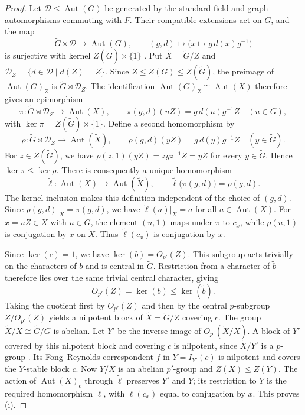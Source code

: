\documentclass[11pt,a4paper]{article}
\theoremstyle{definition}
\theoremstyle{remark}
\numberwithin{equation}{section}
\DeclareMathOperator{\Aut}{Aut}
\begin{document}
\begin{proof}
		Let $\mathcal D\leq\Aut(G)$ be generated by the standard field
		and graph automorphisms commuting with $F$. Their compatible
		extensions act on $\widetilde G$, and the map
		\[
		\widetilde G\rtimes\mathcal D\longrightarrow\Aut(G),\qquad
		(g,d)\longmapsto\bigl(x\mapsto g\,d(x)g^{-1}\bigr)
		\]
		is surjective with kernel $Z(\widetilde G)\times\{1\}$
		\cite[pp.~873--874]{MalleSpath2016}. Put $\widetilde X=\widetilde G/Z$ and
		$\mathcal D_Z=\{d\in\mathcal D\mid d(Z)=Z\}$. Since
		$Z\leq Z(G)\leq Z(\widetilde G)$, the preimage of $\Aut(G)_Z$
		is $\widetilde G\rtimes\mathcal D_Z$. The identification
		$\Aut(G)_Z\cong\Aut(X)$ therefore gives an epimorphism
		\[
		\pi:\widetilde G\rtimes\mathcal D_Z\longrightarrow\Aut(X),
		\qquad \pi(g,d)(uZ)=g\,d(u)g^{-1}Z\quad(u\in G),
		\]
		with $\ker\pi=Z(\widetilde G)\times\{1\}$.
		Define a second homomorphism by
		\[
		\rho:\widetilde G\rtimes\mathcal D_Z\longrightarrow\Aut(\widetilde X),
		\qquad \rho(g,d)(yZ)=g\,d(y)g^{-1}Z\quad(y\in\widetilde G).
		\]
		For $z\in Z(\widetilde G)$, we have
		$\rho(z,1)(yZ)=zyz^{-1}Z=yZ$ for every $y\in\widetilde G$.
		Hence $\ker\pi\leq\ker\rho$. There is consequently a unique
		homomorphism
		\[
		\widetilde\ell:\Aut(X)\longrightarrow\Aut(\widetilde X),
		\qquad \widetilde\ell\bigl(\pi(g,d)\bigr)=\rho(g,d).
		\]
		The kernel inclusion makes this definition independent of the
		choice of $(g,d)$. Since $\rho(g,d)|_X=\pi(g,d)$, we have
		$\widetilde\ell(a)|_X=a$ for all $a\in\Aut(X)$.
		For $x=uZ\in X$ with $u\in G$, the element $(u,1)$ maps under
		$\pi$ to $c_x$, while $\rho(u,1)$ is conjugation by $x$ on
		$\widetilde X$. Thus $\widetilde\ell(c_x)$ is conjugation by $x$.
		
		Since $\ker(c)=1$, we have $\ker(b)=O_{p'}(Z)$. This subgroup
		acts trivially on the characters of $b$ and is central in
		$\widetilde G$. Restriction from a character of $\widetilde b$
		therefore lies over the same trivial central character, giving
		\[
		O_{p'}(Z)=\ker(b)\leq\ker(\widetilde b).
		\]
		Taking the quotient first by $O_{p'}(Z)$ and then by the central
		$p$-subgroup $Z/O_{p'}(Z)$ yields a nilpotent block of
		$\widetilde X=\widetilde G/Z$ covering $c$.
		The group $\widetilde X/X\cong\widetilde G/G$ is abelian.
		Let $Y'$ be the inverse image of $O_{p'}(\widetilde X/X)$.
		A block of $Y'$ covered by this nilpotent block
		and covering $c$ is nilpotent, since $\widetilde X/Y'$ is a
		$p$-group \cite[Lemma~2.2]{AnEaton2011}. Its Fong--Reynolds correspondent
		$f$ in $Y=I_{Y'}(c)$ is nilpotent and covers the $Y$-stable block $c$.
		Now $Y/X$ is an abelian $p'$-group and $Z(X)\leq Z(Y)$.
		The action of $\Aut(X)_c$ through $\widetilde\ell$ preserves $Y'$
		and $Y$; its restriction to $Y$ is the required homomorphism $\ell$,
		with $\ell(c_x)$ equal to conjugation by $x$. This proves (i).
	\end{proof}
	
\end{document}
